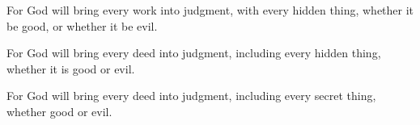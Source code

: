 			\begin{versebox}
					\item[BHS] 
					\item[LXX] 
					\item[ASV] For God will bring every work into judgment, with every hidden thing, whether it be good, or whether it be evil.
					\item[NIV] For God will bring every deed into judgment, including every hidden thing, whether it is good or evil.
					\item[NRSV] For God will bring every deed into judgment, including every secret thing, whether good or evil.
			\end{versebox}
